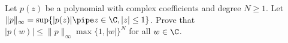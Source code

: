 Let $p(z)$ be a polynomial with complex coefficients and degree $N\geq
1$. Let $\|p\|_{\infty}=\sup\{|p(z)| \pipe z\in \C, |z|\leq
1\}$. Prove that $|p(w)|\leq \|p\|_{\infty}\max\{1,|w|\}^N$ for all
$w\in \C$.
